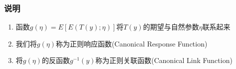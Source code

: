 \subsubsection{说明}
\begin{enumerate}
	\item 函数$g(\eta) = E\left[E(T(y);\eta)\right]$将$T(y)$的期望与自然参数$\eta$联系起来
	\item 我们将$g(\eta)$称为正则响应函数(Canonical Response Function)
	\item 将$g(\eta)$的反函数$g^{-1}(y)$称为正则关联函数(Canonical Link Function)
\end{enumerate}



% 
















